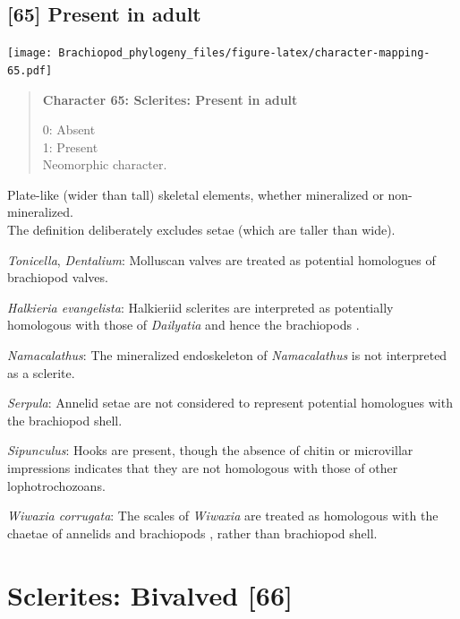 \documentclass[openany]{book}
\begin{document}
\subsection*{{[}65{]} Present in adult}\label{present-in-adult}

\texttt{[image: Brachiopod\_phylogeny\_files/figure-latex/character-mapping-65.pdf]}

\begin{quote}
\textbf{Character 65: Sclerites: Present in adult}

0: Absent\\
1: Present\\
Neomorphic character.
\end{quote}

Plate-like (wider than tall) skeletal elements, whether mineralized or
non-mineralized.\\
The definition deliberately excludes setae (which are taller than wide).

\hypertarget{Dentalium-coding-65}{}
\emph{Tonicella}, \emph{Dentalium}: Molluscan valves are treated as
potential homologues of brachiopod valves.

\hypertarget{Halkieria_evangelista-coding-65}{}
\emph{Halkieria evangelista}: Halkieriid sclerites are interpreted as
potentially homologous with those of \emph{Dailyatia} and hence the
brachiopods \citep{Zhao2017}.

\hypertarget{Namacalathus-coding-65}{}
\emph{Namacalathus}: The mineralized endoskeleton of \emph{Namacalathus}
is not interpreted as a sclerite.

\hypertarget{Serpula-coding-65}{}
\emph{Serpula}: Annelid setae are not considered to represent potential
homologues with the brachiopod shell.

\hypertarget{Sipunculus-coding-65}{}
\emph{Sipunculus}: Hooks are present, though the absence of chitin or
microvillar impressions indicates that they are not homologous with
those of other lophotrochozoans.

\hypertarget{Wiwaxia_corrugata-coding-65}{}
\emph{Wiwaxia corrugata}: The scales of \emph{Wiwaxia} are treated as
homologous with the chaetae of annelids and brachiopods
\citep{Butterfield1990, Smith2014, Zhang2015}, rather than brachiopod
shell.

\section{Sclerites: Bivalved {[}66{]}}\label{sclerites-bivalved-66}
\end{document}

